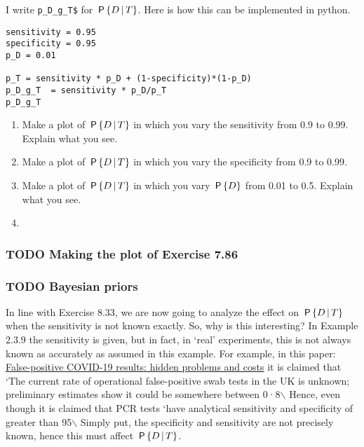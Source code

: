 \documentclass[a4paper]{article}
\begin{document}
I write \texttt{p\_D\_g\_T\$} for \(\P{D\given T}\). Here is how this can be implemented in python.

\begin{verbatim}
sensitivity = 0.95
specificity = 0.95
p_D = 0.01

p_T = sensitivity * p_D + (1-specificity)*(1-p_D)
p_D_g_T  = sensitivity * p_D/p_T
p_D_g_T
\end{verbatim}

\begin{enumerate}
\item Make a plot of \(\P{D\given T}\) in which you vary the sensitivity from 0.9 to 0.99. Explain what you see.
\item Make a plot of \(\P{D\given T}\) in which you vary the specificity from 0.9 to 0.99.
\item Make a plot of \(\P{D\given T}\) in which you vary \(\P{D}\) from 0.01 to 0.5. Explain what you see.
\item 
\end{enumerate}



\subsubsection{{\bfseries\sffamily TODO} Making the plot of Exercise 7.86}
\label{sec:orgf534b47}

\subsubsection{{\bfseries\sffamily TODO} Bayesian priors}
\label{sec:orgac48e35}

In line with Exercise 8.33, we are now going to analyze the effect on \(\P{D\given T}\) when the sensitivity is not known exactly.
So, why is this interesting?
In Example 2.3.9 the sensitivity is given, but in fact, in `real' experiments, this is not always known as accurately as assumed in this example.
For example, in this paper: \href{https://www.thelancet.com/journals/lanres/article/PIIS2213-2600(20)30453-7/fulltext}{False-positive COVID-19 results: hidden problems and costs} it is claimed that `The current rate of operational false-positive swab tests in the UK is unknown; preliminary estimates show it could be somewhere between 0·8$\backslash$%
Hence, even though it is claimed that PCR tests `have analytical sensitivity and specificity of greater than 95$\backslash$%
Simply put, the specificity and sensitivity are not precisely known, hence this must affect \(\P{D\given T}\).
\end{document}
